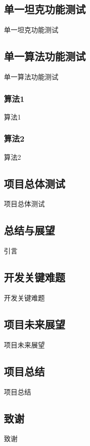 \documentclass[twoside]{CUGThesis}
\begin{document}
	\subsection{单一坦克功能测试}
	单一坦克功能测试
	\subsection{单一算法功能测试}
	单一算法功能测试
		\subsubsection{算法1}
		算法1
		\subsubsection{算法2}
		算法2
	\subsection{项目总体测试}
	项目总体测试

\begin{spacing}{2}
	\section{总结与展望}
\end{spacing}
引言
	\subsection{开发关键难题}
	开发关键难题
	\subsection{项目未来展望}
	项目未来展望
	\subsection{项目总结}
	项目总结

\begin{spacing}{2}
	\section*{致谢}
\end{spacing}
{}
致谢



\end{document}
